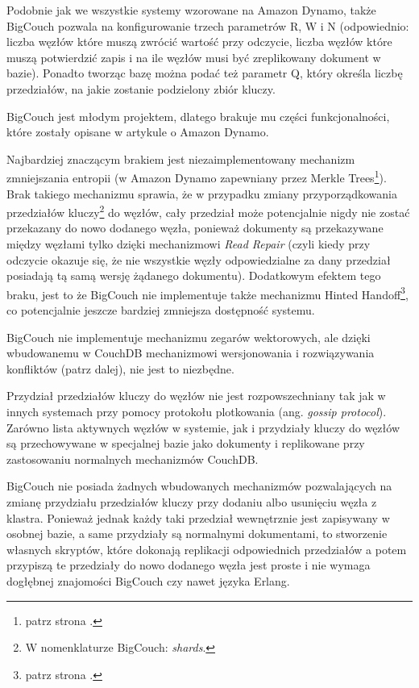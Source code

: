Podobnie jak we wszystkie systemy wzorowane na Amazon Dynamo, także BigCouch pozwala na konfigurowanie trzech parametrów R, W i N (odpowiednio: liczba węzłów które muszą zwrócić wartość przy odczycie, liczba węzłów które muszą potwierdzić zapis i na ile węzłów musi być zreplikowany dokument w bazie).
Ponadto tworząc bazę można podać też parametr Q, który określa liczbę przedziałów, na jakie zostanie podzielony zbiór kluczy.

BigCouch jest młodym projektem, dlatego brakuje mu części funkcjonalności, które zostały opisane w artykule o Amazon Dynamo.

Najbardziej znaczącym brakiem jest niezaimplementowany mechanizm zmniejszania entropii (w Amazon Dynamo zapewniany przez Merkle Trees\footnote{patrz strona \pageref{merkle-trees}.}).
Brak takiego mechanizmu sprawia, że w przypadku zmiany przyporządkowania przedziałów kluczy\footnote{W nomenklaturze BigCouch: \emph{shards}.} do węzłów, cały przedział może potencjalnie nigdy nie zostać przekazany do nowo dodanego węzła, ponieważ dokumenty są przekazywane między węzłami tylko dzięki mechanizmowi \emph{Read Repair} (czyli kiedy przy odczycie okazuje się, że nie wszystkie węzły odpowiedzialne za dany przedział posiadają tą samą wersję żądanego dokumentu).
Dodatkowym efektem tego braku, jest to że BigCouch nie implementuje także mechanizmu Hinted Handoff\footnote{patrz strona \pageref{sec:dynamo-hinted-handoff}.}, co potencjalnie jeszcze bardziej zmniejsza dostępność systemu.

BigCouch nie implementuje mechanizmu zegarów wektorowych, ale dzięki wbudowanemu w CouchDB mechanizmowi wersjonowania i rozwiązywania konfliktów (patrz dalej), nie jest to niezbędne.

Przydział przedziałów kluczy do węzłów nie jest rozpowszechniany tak jak w innych systemach przy pomocy protokołu plotkowania (ang. \emph{gossip protocol}).
Zarówno lista aktywnych węzłów w systemie, jak i przydziały kluczy do węzłów są przechowywane w specjalnej bazie jako dokumenty i replikowane przy zastosowaniu normalnych mechanizmów CouchDB. 

BigCouch nie posiada żadnych wbudowanych mechanizmów pozwalających na zmianę przydziału przedziałów kluczy przy dodaniu albo usunięciu węzła z klastra.
Ponieważ jednak każdy taki przedział wewnętrznie jest zapisywany w osobnej bazie, a same przydziały są normalnymi dokumentami, to stworzenie własnych skryptów, które dokonają replikacji odpowiednich przedziałów a potem przypiszą te przedziały do nowo dodanego węzła jest proste i nie wymaga dogłębnej znajomości BigCouch czy nawet języka Erlang.

